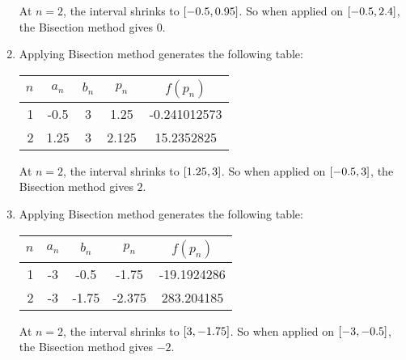 \documentclass[../../../../Assignments.tex]{subfiles}
\begin{document}
\begin{solution}
\begin{enumerate}[label = (\alph*)]
            At \(n = 2\), the interval shrinks to
            \(\interval{\num{-0.5}}{\num{0.95}}\). So when applied on
            \(\interval{\num{-0.5}}{\num{2.4}}\), the Bisection method gives
            \(0\).

        \item Applying Bisection method generates the following table:

            \begin{table}[H]
                \centering
                \begin{tabular}{r S[table-format=-1.2] S[table-format=1] S[table-format=1.3] S[table-format=-1.9]}
                    \toprule
                    \(n\)  &   {\(a_n\)}   &   {\(b_n\)}   &   {\(p_n\)}   &  {\(f(p_n)\)}  \\
                      &  -0.5         &  3            &  1.25         &  -0.241012573  \\
                        2  &   1.25        &  3            &  2.125        &  15.2352825    \\
                    \bottomrule
                \end{tabular}
            \end{table}

            At \(n = 2\), the interval shrinks to \(\interval{\num{1.25}}{3}\).
            So when applied on \(\interval{\num{-0.5}}{3}\), the Bisection
            method gives \(2\).

        \item Applying Bisection method generates the following table:

            \begin{table}[H]
                \centering
                \begin{tabular}{r S[table-format=-1] S[table-format=-1.2] S[table-format=-1.3] S[table-format=-2.7]}
                    \toprule
                    \(n\)  &   {\(a_n\)}   &   {\(b_n\)}   &   {\(p_n\)}   &  {\(f(p_n)\)}  \\
                      &  -3           &  -0.5         &  -1.75        &  -19.1924286   \\
                        2  &  -3           &  -1.75        &  -2.375       &  283.204185    \\
                    \bottomrule
                \end{tabular}
            \end{table}

            At \(n = 2\), the interval shrinks to
            \(\interval{\-3}{\num{-1.75}}\). So when applied on
            \(\interval{-3}{\num{-0.5}}\), the Bisection method gives \(-2\).
    \end{enumerate}
\end{solution}
\end{document}
